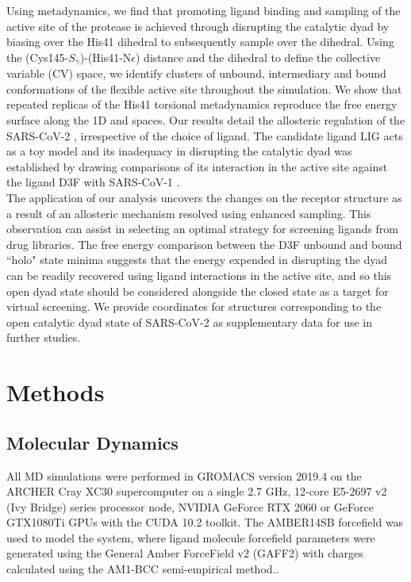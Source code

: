 Using metadynamics, we find that promoting ligand binding and sampling of the active site of the protease is achieved through disrupting the catalytic dyad by biasing over the His41 \dihone dihedral to subsequently sample over the \dihtwo dihedral. Using the (Cys145-$S_{\gamma}$)-(His41-N{$\epsilon$}) distance and the \dihtwo dihedral to define the collective variable (CV) space, we identify clusters of unbound, intermediary and bound conformations of the flexible \mpro active site throughout the simulation. We show that repeated replicas of the His41 torsional metadynamics reproduce the free energy surface along the 1D \dihone and \dihtwo spaces. Our results detail the allosteric regulation of the SARS-CoV-2 \mpro\!\!, irrespective of the choice of ligand. The candidate ligand LIG acts as a toy model and its inadequacy in disrupting the catalytic dyad was established by drawing comparisons of its interaction in the \mpro active site against the ligand D3F with SARS-CoV-1 \mpro\!\!.\\

The application of our analysis uncovers the changes on the receptor structure as a result of an allosteric mechanism resolved using enhanced sampling. This observation can assist in selecting an optimal strategy for screening ligands from drug libraries. The free energy comparison between the D3F unbound and bound ``holo" state minima suggests that the energy expended in disrupting the dyad can be readily recovered using ligand interactions in the active site, and so this open dyad state should be considered alongside the closed state as a target for virtual screening. We provide coordinates for structures corresponding to the open catalytic dyad state of SARS-CoV-2 \mpro as supplementary data for use in further studies. 

%
%
%
%
%
%
\section{Methods}

\subsection*{Molecular Dynamics}
All MD simulations were performed in GROMACS version 2019.4 on the ARCHER Cray XC30 supercomputer on a single 2.7 GHz, 12-core E5-2697 v2 (Ivy Bridge) series processor node, NVIDIA GeForce RTX 2060 or GeForce GTX1080Ti GPUs with the CUDA 10.2 toolkit.  The AMBER14SB forcefield \cite{amberff14SB} was used to model the system, where ligand molecule forcefield parameters were generated using the General Amber ForceField v2 (GAFF2) with charges calculated using the AM1-BCC semi-empirical method.\cite{amber16}.\\

